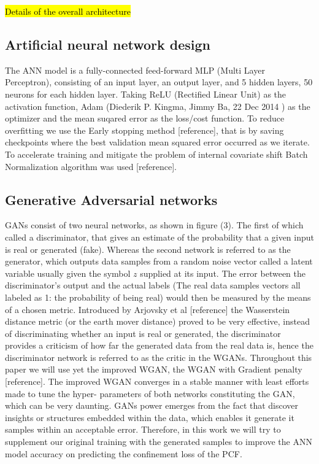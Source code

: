 \documentclass[draft, a4, 10pt, onecolumn]{IEEEtran}
\begin{document}
\hl{Details of the overall architecture}

\subsection{Artificial neural network design}
\label{ssec:ann}
The ANN model is a fully-connected feed-forward MLP (Multi Layer Perceptron), consisting of an input layer, an output layer, and 5 hidden layers, 50 neurons for each hidden layer. Taking ReLU (Rectified Linear Unit) as the activation function, Adam (Diederik P. Kingma, Jimmy Ba, 22 Dec 2014 ) as the optimizer and the mean suqared error as the loss/cost function. To reduce overfitting we use the Early stopping method [reference], that is by saving checkpoints where the best validation mean squared error occurred as we iterate. To accelerate training and mitigate the problem of internal covariate shift Batch Normalization algorithm was used [reference]. 

\subsection{Generative Adversarial networks}
\label{ssec:gan}

GANs consist of two neural networks, as shown in figure (3). The first of which called a discriminator, that gives an estimate of the probability that a given input is real or generated (fake). Whereas the second network is referred to as the generator, which outputs data samples from a random noise vector called a latent variable usually given the symbol $z$ supplied at its input. The error between the discriminator’s output and the actual labels (The real data samples vectors all labeled as 1: the probability of being real) would then be measured by the means of a chosen metric. Introduced by Arjovsky et al [reference] the Wasserstein distance metric (or the earth mover distance) proved to be very effective, instead of discriminating whether an input is real or generated, the discriminator provides a criticism of how far the generated data from the real data is, hence the discriminator network is referred to as the critic in the WGANs. Throughout this paper we will use yet the improved WGAN, the WGAN with Gradient penalty [reference]. The improved WGAN converges in a stable manner with least efforts made to tune the hyper- parameters of both networks constituting the GAN, which can be very daunting.
GANs power emerges from the fact that discover insights or structures embedded within the data, which enables it generate it samples within an acceptable error. Therefore, in this work we will try to supplement our original training with the generated samples to improve the ANN model accuracy on predicting the confinement loss of the PCF. 
\end{document}
